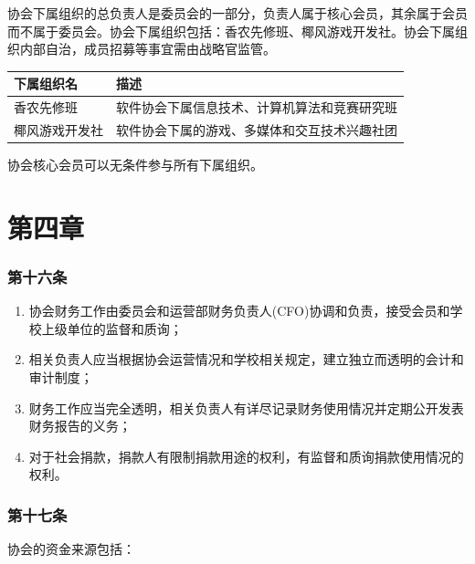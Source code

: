 \documentclass[
]{ctexart}
\begin{document}
协会下属组织的总负责人是委员会的一部分，负责人属于核心会员，其余属于会员而不属于委员会。协会下属组织包括：香农先修班、椰风游戏开发社。协会下属组织内部自治，成员招募等事宜需由战略官监管。

\begin{longtable}[]{@{}ll@{}}
\toprule()
\textbf{下属组织名} & \textbf{描述} \\
\midrule()
\endhead
香农先修班 & 软件协会下属信息技术、计算机算法和竞赛研究班 \\
椰风游戏开发社 & 软件协会下属的游戏、多媒体和交互技术兴趣社团 \\
\bottomrule()
\end{longtable}

协会核心会员可以无条件参与所有下属组织。

\hypertarget{ux7b2cux56dbux7ae0-ux8d22ux52a1ux5236ux5ea6}{%
\section{第四章}\label{ux7b2cux56dbux7ae0-ux8d22ux52a1ux5236ux5ea6}}

\hypertarget{ux7b2cux5341ux516dux6761-ux8d22ux52a1ux653fux7b56}{%
\subsubsection{第十六条}\label{ux7b2cux5341ux516dux6761-ux8d22ux52a1ux653fux7b56}}

\begin{enumerate}
\def\labelenumi{\arabic{enumi}.}
\item
  协会财务工作由委员会和运营部财务负责人(CFO)协调和负责，接受会员和学校上级单位的监督和质询；
\item
  相关负责人应当根据协会运营情况和学校相关规定，建立独立而透明的会计和审计制度；
\item
  财务工作应当完全透明，相关负责人有详尽记录财务使用情况并定期公开发表财务报告的义务；
\item
  对于社会捐款，捐款人有限制捐款用途的权利，有监督和质询捐款使用情况的权利。
\end{enumerate}

\hypertarget{ux7b2cux5341ux4e03ux6761-ux7ecfux8d39ux6765ux6e90}{%
\subsubsection{第十七条}\label{ux7b2cux5341ux4e03ux6761-ux7ecfux8d39ux6765ux6e90}}

协会的资金来源包括：
\end{document}
